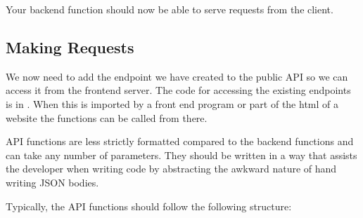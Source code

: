 \documentclass[letterpaper,10pt,english]{sphinxmanual}
\begin{document}
Your back\sphinxhyphen{}end function should now be able to serve requests from the
client.


\subsection{Making Requests}
\label{\detokenize{docs/Expansion/api-expansion:making-requests}}
We now need to add the end\sphinxhyphen{}point we have created to the public API so we
can access it from the front\sphinxhyphen{}end server. The code for accessing the
existing endpoints is in . When this is imported by a
front end program or part of the html of a website the functions can be
called from there.

API functions are less strictly formatted compared to the back\sphinxhyphen{}end
functions and can take any number of parameters. They should be written
in a way that assists the developer when writing code by abstracting the
awkward nature of hand writing JSON bodies.

Typically, the API functions should follow the following structure:

\begin{sphinxVerbatim}[commandchars=\\\{\}]
      
          
           
         
         
         
             
         

      
         
     
\end{sphinxVerbatim}
\end{document}
